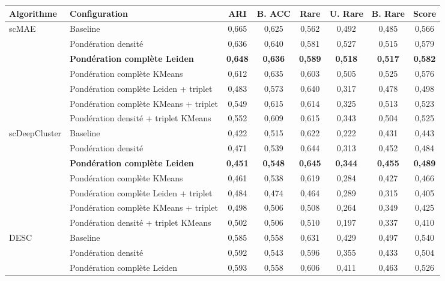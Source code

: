 \begin{table}[H]
\centering
\scriptsize
\renewcommand{\arraystretch}{1.04}
\begin{tabularx}{\textwidth}{l X c c c c c c}
\toprule
\textbf{Algorithme} & \textbf{Configuration} & \textbf{ARI} & \textbf{B. ACC} & \textbf{Rare} & \textbf{U. Rare} & \textbf{B. Rare} & \textbf{Score} \\
\midrule
scMAE & Baseline & 0,665 & 0,625 & 0,562 & 0,492 & 0,485 & 0,566 \\
 & Pondération densité & 0,636 & 0,640 & 0,581 & 0,527 & 0,515 & 0,579 \\
 & \textbf{Pondération complète Leiden} & \textbf{0,648} & \textbf{0,636} & \textbf{0,589} & \textbf{0,518} & \textbf{0,517} & \textbf{0,582} \\
 & Pondération complète KMeans & 0,612 & 0,635 & 0,603 & 0,505 & 0,525 & 0,576 \\
 & Pondération complète Leiden + triplet & 0,483 & 0,573 & 0,640 & 0,317 & 0,478 & 0,498 \\
 & Pondération complète KMeans + triplet & 0,549 & 0,615 & 0,614 & 0,325 & 0,513 & 0,523 \\
 & Pondération densité + triplet KMeans & 0,552 & 0,609 & 0,615 & 0,343 & 0,504 & 0,525 \\
\addlinespace[0.25em]
scDeepCluster & Baseline & 0,422 & 0,515 & 0,622 & 0,222 & 0,431 & 0,443 \\
 & Pondération densité & 0,471 & 0,539 & 0,644 & 0,313 & 0,452 & 0,484 \\
 & \textbf{Pondération complète Leiden} & \textbf{0,451} & \textbf{0,548} & \textbf{0,645} & \textbf{0,344} & \textbf{0,455} & \textbf{0,489} \\
 & Pondération complète KMeans & 0,461 & 0,538 & 0,619 & 0,284 & 0,427 & 0,466 \\
 & Pondération complète Leiden + triplet & 0,484 & 0,474 & 0,464 & 0,289 & 0,315 & 0,405 \\
 & Pondération complète KMeans + triplet & 0,498 & 0,506 & 0,508 & 0,264 & 0,349 & 0,425 \\
 & Pondération densité + triplet KMeans & 0,502 & 0,506 & 0,510 & 0,197 & 0,337 & 0,410 \\
\addlinespace[0.25em]
DESC & Baseline & 0,585 & 0,558 & 0,631 & 0,429 & 0,497 & 0,540 \\
 & Pondération densité & 0,592 & 0,543 & 0,596 & 0,355 & 0,433 & 0,504 \\
 & Pondération complète Leiden & 0,593 & 0,558 & 0,606 & 0,411 & 0,463 & 0,526 \\

\end{tabularx}
\end{table}
